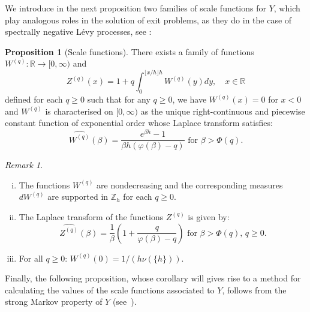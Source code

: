 \documentclass[pdftex,oneside,11pt,reqno]{amsart}
\theoremstyle{definition}
\theoremstyle{theorem}
\newtheorem{proposition}{Proposition}[section]
\theoremstyle{remark}
\newtheorem{remark}{Remark}[section]
\numberwithin{equation}{section}
\numberwithin{definition}{section}
\begin{document}
We introduce in the next proposition two families of scale functions for $Y$,
which play analogous roles in the solution of exit problems, as they do in the
case of spectrally negative L\'evy processes, see \cite[Subsections
4.1-4-3]{vidmar:fluctuation_theory}: 

\begin{proposition}[Scale functions]\label{proposition:scale_functions_for_USF}
There exists a family of functions $W^{(q)}:\mathbb{R}\to [0,\infty)$ and
$$Z^{(q)}(x)=1+q\int_0^{\lfloor x/h\rfloor h}W^{(q)}(y)dy,\quad
x\in\mathbb{R}$$ defined for each $q\geq 0$ such that for any $q\geq 0$, we
have ${W^{(q)}}(x)=0$ for $x<0$ and ${W^{(q)}}$ is characterised on $[0,\infty)$ as the
unique right-continuous and piecewise constant function of exponential order
whose Laplace transform satisfies: $$\widehat{W^{(q)}}(\beta)=\frac{e^{\beta
h}-1}{\beta h(\varphi(\beta)-q)}\text{ for }\beta>\Phi(q).$$
\end{proposition}

\begin{remark}\label{remark:scalefnsUSF}
\begin{enumerate}[(i)]
\item\label{remark:scalefnsUSF:one} The functions ${W^{(q)}}$ are nondecreasing and the corresponding measures $d{W^{(q)}}$ are supported in ${\mathbb{Z}_h}$ for each $q\geq 0$. 
\item\label{remark:scalefnsUSF:three} The Laplace transform of the functions ${Z^{(q)}}$ is given by: $$\widehat{Z^{(q)}}(\beta)=\frac{1}{\beta}\left(1+\frac{q}{\varphi(\beta)-q}\right)\text{ for }\beta>\Phi(q),\, q\geq 0.$$
\item\label{remark:scalefnsUSF:four} For all $q\geq 0$: ${W^{(q)}}(0)=1/(h{\nu}(\{h\}))$. 
\end{enumerate}
\end{remark}
Finally, the following proposition, whose corollary will gives rise to a method for
calculating the values of the scale functions associated to $Y$, follows from
the strong Markov property of $Y$ (see~\cite[Subsection~4.4]{vidmar:fluctuation_theory}). 
\end{document}
